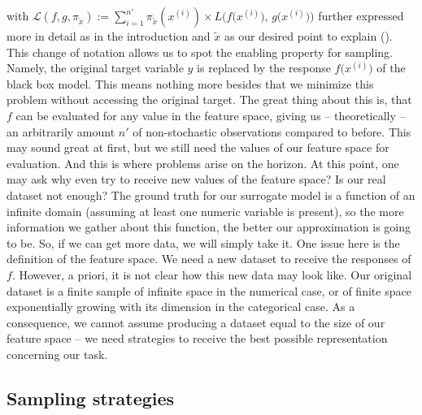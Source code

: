 \documentclass[
]{krantz}
\begin{document}
with \(\mathcal{L}\left(f, g, \pi_{\tilde x} \right) := \sum_{i=1}^{n'} \pi_{\tilde x}(x^{(i)}) \times L\Big( f\big(x^{(i)}\big), \, g\big(x^{(i)}\big) \Big)\) further expressed more in detail as in the introduction and \(\tilde x\) as our desired point to explain (\citet{LIMEformula}).
This change of notation allows us to spot the enabling property for sampling.
Namely, the original target variable \(y\) is replaced by the response \(f\big(x^{(i)} \big)\) of the black box model.
This means nothing more besides that we minimize this problem without accessing the original target.
The great thing about this is, that \(f\) can be evaluated for any value in the feature space, giving us -- theoretically -- an arbitrarily amount \(n'\) of non-stochastic observations compared to before.
This may sound great at first, but we still need the values of our feature space for evaluation.
And this is where problems arise on the horizon.
At this point, one may ask why even try to receive new values of the feature space?
Is our real dataset not enough?
The ground truth for our surrogate model is a function of an infinite domain (assuming at least one numeric variable is present), so the more information we gather about this function, the better our approximation is going to be.
So, if we can get more data, we will simply take it.
One issue here is the definition of the feature space.
We need a new dataset to receive the responses of \(f\).
However, a priori, it is not clear how this new data may look like.
Our original dataset is a finite sample of infinite space in the numerical case, or of finite space exponentially growing with its dimension in the categorical case.
As a consequence, we cannot assume producing a dataset equal to the size of our feature space -- we need strategies to receive the best possible representation concerning our task.

\hypertarget{sampling-strategies}{%
\subsection{Sampling strategies}\label{sampling-strategies}}
\end{document}
